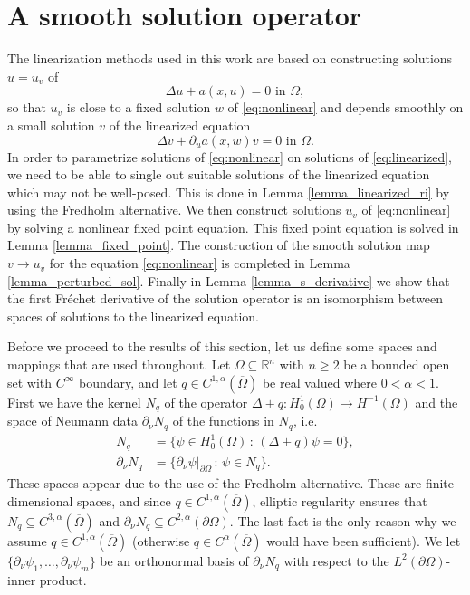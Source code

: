 \documentclass[11pt,a4paper]{amsart}
\theoremstyle{definition}
\numberwithin{equation}{section}
\newcommand{\mR}{\mathbb{R}}                    %
\newcommand{\ol}[1]{\overline{#1}}
\newcommand{\p}{\partial}
\newcommand{\Om}{\Omega}
\begin{document}
\section{A smooth solution operator} \label{sec_solvability}
The linearization methods used in this work are based on constructing solutions $u = u_v$ of 
\begin{equation} \label{eq:nonlinear}
	\Delta u + a(x, u) = 0 \text{ in }\Omega,
\end{equation}
so that $u_v$ is close to a fixed solution $w$ of \eqref{eq:nonlinear} and depends smoothly on a small solution $v$ of the linearized equation
\begin{equation} \label{eq:linearized}
	\Delta v + \partial_{u}a(x, w)v = 0 \text{ in }\Omega.
\end{equation}
In order to parametrize solutions of \eqref{eq:nonlinear} on solutions of \eqref{eq:linearized}, we need to be able to single out suitable solutions of the linearized equation which may not be well-posed.
This is done in Lemma \ref{lemma_linearized_ri} by using the Fredholm alternative.
We then construct solutions $u_v$ of \eqref{eq:nonlinear} by solving a nonlinear fixed point equation.
This fixed point equation is solved in Lemma \ref{lemma_fixed_point}.
The construction of the smooth solution map $v \to u_v$ for the equation \eqref{eq:nonlinear} is completed in Lemma \ref{lemma_perturbed_sol}. Finally in Lemma \ref{lemma_s_derivative} we show that the first Fréchet derivative of the solution operator is an isomorphism between spaces of solutions to the linearized equation.

Before we proceed to the results of this section, let us define some spaces and mappings that are used throughout. Let $\Omega \subseteq \mR^n$ with $n \geq 2$ be a bounded open set with $C^{\infty}$ boundary, and let $q \in C^{1,\alpha}(\ol{\Om})$ be real valued where $0 < \alpha < 1$. First we have the kernel \( N_{q} \) of the operator \( \Delta+q:H_{0}^{1}(\Omega)\to H^{-1}(\Omega) \) and the space of Neumann data \( \partial_{\nu}N_{q} \) of the functions in \( N_{q} \), i.e.\ 
\begin{align*}
N_q &= \{ \psi \in H^1_0(\Omega) \,:\, (\Delta+q)\psi = 0 \}, \\
\p_{\nu} N_q &= \{ \p_{\nu} \psi|_{\p \Omega} \,:\, \psi \in N_q \}.
\end{align*}
These spaces appear due to the use of the Fredholm alternative. These are finite dimensional spaces, and since $q \in C^{1,\alpha}(\ol{\Om})$, elliptic regularity \cite[Theorem 2.2]{browder62} ensures that $N_q \subseteq C^{3,\alpha}(\ol{\Om})$ and $\p_{\nu} N_q \subseteq C^{2,\alpha}(\p \Om)$. The last fact is the only reason why we assume $q \in C^{1,\alpha}(\ol{\Om})$ (otherwise $q \in C^{\alpha}(\ol{\Om})$ would have been sufficient). We let $\{ \p_{\nu} \psi_1, \ldots, \p_{\nu} \psi_m \}$ be an orthonormal basis of $\p_{\nu} N_q$ with respect to the $L^2(\p \Om)$-inner product.
\end{document}
